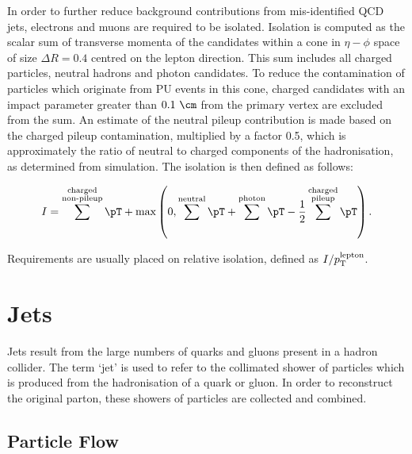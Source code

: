 In order to further reduce background contributions from mis-identified \ac{QCD} jets,
electrons and muons are required to be isolated. Isolation is computed as the
scalar sum of transverse momenta of the candidates within a cone in
$\eta-\phi$ space of size $\Delta R = 0.4$ centred on the lepton direction. 
This sum includes all charged particles, neutral hadrons and photon candidates. 
To reduce the contamination of particles which originate from \ac{PU} events 
in this cone, charged  candidates with an impact parameter greater than 
$0.1~\cm$ from the primary vertex are excluded from the sum. An estimate of the 
neutral pileup contribution is made based on the charged pileup contamination,
multiplied by a factor 0.5, which is approximately the ratio of neutral to
charged components of the hadronisation, as determined from simulation.   
The isolation is then defined as follows:

\begin{equation}
I = \sum^{\substack{\text{charged} \\ \text{non-pileup}}}\pT +
\text{max}\left(0,\sum^{\text{neutral}}\pT+\sum^{\text{photon}}\pT-\frac{1}{2}\sum^{\substack{\text{charged}
\\ \text{pileup}}}\pT\right).
\end{equation}

Requirements are usually placed on relative isolation, defined as
$I / p_{\mathrm{T}}^{\text{lepton}}$. 

\section{Jets}
\label{sec:jets}

Jets result from the large numbers of quarks and gluons present in a hadron
collider. The term `jet' is used to refer to the collimated shower of particles
which is produced from the hadronisation of a quark or gluon. In order to
reconstruct the original parton, these showers of particles are collected
and combined. 

\subsection{Particle Flow}
\label{sec:particleflow}

